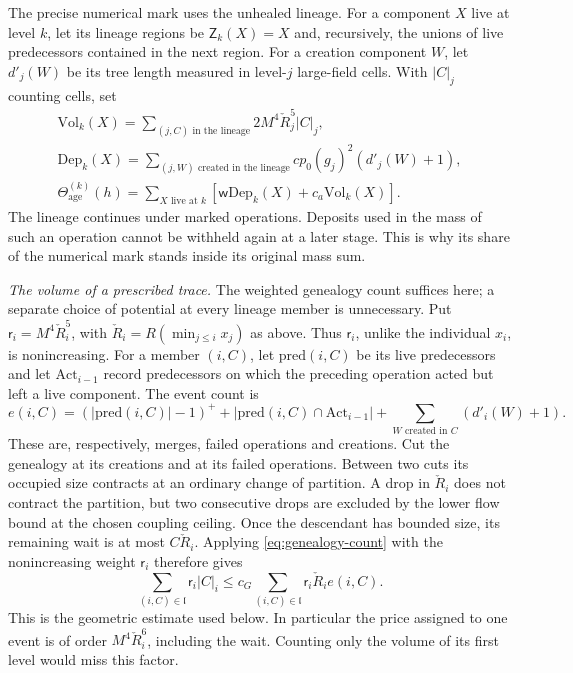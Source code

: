 \documentclass[11pt,letterpaper,reqno]{amsart}
\theoremstyle{definition}
\theoremstyle{remark}
\begin{document}
The precise numerical mark uses the unhealed lineage.
For a component $X$ live at level $k$, let its lineage
regions be $\mathsf Z_k(X)=X$ and, recursively,
the unions of live predecessors contained in the next
region. For a creation component $W$, let $d'_j(W)$ be its tree
length measured in level-$j$ large-field cells. With $|C|_j$ counting cells, set
\begin{equation}\label{eq:mrg-prepaid-mark}
 \begin{gathered}
 \mathrm{Vol}_k(X)=\sum_{(j,C)\text{ in the lineage}}
                           2M^4\check R_j^5|C|_j,\\
 \mathrm{Dep}_k(X)=\sum_{(j,W)\text{ created in the lineage}}
                      cp_0(g_j)^2(d'_j(W)+1),\\
 \Theta_{\mathrm{age}}^{(k)}(h)=
       \sum_{X\text{ live at }k}
       [\mathsf w\mathrm{Dep}_k(X)+c_a\mathrm{Vol}_k(X)].
 \end{gathered}
\end{equation}
The lineage continues under marked operations.
Deposits used in the mass of such an operation
cannot be withheld again at a later stage.
This is why its share of the numerical mark
stands inside its original mass sum.

\emph{The volume of a prescribed trace.}
The weighted genealogy count suffices here; a separate choice of
potential at every lineage member is unnecessary. Put
\(\mathsf r_i=M^4\check R_i^5\), with
\(\check R_i=R(\min_{j\le i}x_j)\) as above. Thus
\(\mathsf r_i\), unlike the individual \(x_i\), is
nonincreasing. For a member \((i,C)\), let
\(\mathrm{pred}(i,C)\) be its live predecessors and let
\(\mathrm{Act}_{i-1}\) record predecessors on which the preceding
operation acted but left a live component. The event count is
\[
 e(i,C)=(|\mathrm{pred}(i,C)|-1)^+
       +|\mathrm{pred}(i,C)\cap\mathrm{Act}_{i-1}|
       +\sum_{W\text{ created in }C}(d'_i(W)+1).
\]
These are, respectively, merges, failed operations and creations.
Cut the genealogy at its creations and at its failed operations.
Between two cuts its occupied size contracts at an ordinary
change of partition. A drop in \(\check R_i\) does not contract
the partition, but two consecutive drops are excluded by the
lower flow bound at the chosen coupling ceiling. Once the
descendant has bounded size, its remaining wait is at most
\(C\check R_i\). Applying \eqref{eq:genealogy-count} with the
nonincreasing weight \(\mathsf r_i\) therefore gives
\begin{equation}\label{eq:trace-volume-events}
 \sum_{(i,C)\in\mathfrak l}\mathsf r_i|C|_i
 \le c_G\sum_{(i,C)\in\mathfrak l}
                     \mathsf r_i\check R_i e(i,C).
\end{equation}
This is the geometric estimate used below. In particular the
price assigned to one event is of order
\(M^4\check R_i^6\), including the wait. Counting only the
volume of its first level would miss this factor.
\end{document}
